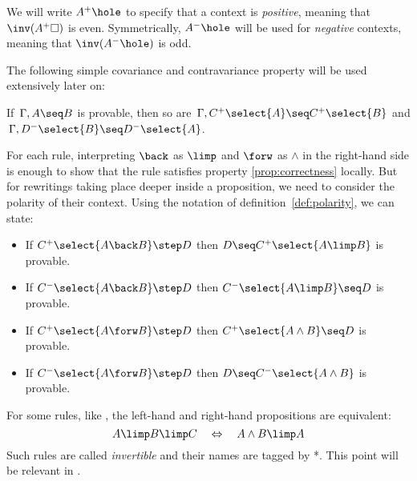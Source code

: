 \begin{definition}\label{def:polarity}
We will write $A^+\hole$ to specify that a context is {\em positive},
meaning that $\inv(A^+\square)$ is even. Symmetrically, $A^-\hole$ will be
used for {\em negative} contexts, meaning that $\inv(A^-\hole)$ is odd.
\end{definition}
The following simple covariance and contravariance property will be used
extensively later on:
\begin{lemma}[Variance]\label{prop:cov}
  If $\, \Gamma, A\seq B$ is provable, then so are $\, \Gamma, C^+\select{A}\seq C^+\select{B}$
  and $\, \Gamma, D^-\select{B}\seq D^-\select{A}$.
\end{lemma}

For each rule, interpreting $\back$ as $\limp$ and $\forw$ as $\land$ in the
right-hand side is enough to show that the rule satisfies property
\ref{prop:correctness} locally. But for rewritings taking place deeper inside a
proposition, we need to consider the polarity of their context. Using the
notation of definition~\ref{def:polarity}, we can state:
\begin{lemma}\label{lemma:rules-valid-in-context}
  \phantom{a}
  \begin{itemize}
    \item If $C^+\select{A\back B}\step D$ then $D \seq C^+\select{A\limp B}$ is provable.
    \item If $C^-\select{A\back B} \step D$ then $C^-\select{A\limp B}\seq D$ is provable.
    \item If $C^+\select{A \forw B} \step D$ then $ C^+\select{A \land B}\seq D$ is provable.
    \item If $C^-\select{A \forw B} \step D$ then $D \seq C^-\select{A \land B}$ is provable.
  \end{itemize}
\end{lemma}
\begin{remark}
  For some rules, like , the left-hand and
  right-hand propositions are equivalent:
  $$A \limp B \limp C ~~~\Leftrightarrow~~~ A \land B \limp A$$ Such rules are
  called {\em invertible} and their names are tagged by *. This point will be
  relevant in .
\end{remark}


